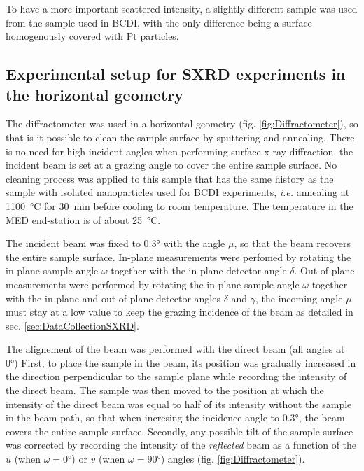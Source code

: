 To have a more important scattered intensity, a slightly different sample was used from the sample used in BCDI, with the only difference being a surface homogenously covered with Pt particles.

\subsection{Experimental setup for SXRD experiments in the horizontal geometry}\label{sec:SXRDSetupH}

The diffractometer was used in a horizontal geometry (fig. \ref{fig:Diffractometer}), so that is it possible to clean the sample surface by sputtering and annealing.
There is no need for high incident angles when performing surface x-ray diffraction, the incident beam is set at a grazing angle to cover the entire sample surface.
No cleaning process was applied to this sample that has the same history as the sample with isolated nanoparticles used for BCDI experiments, \textit{i.e.} annealing at \qty{1100}{\degreeCelsius} for \qty{30}{\minute} before cooling to room temperature.
The temperature in the MED end-station is of about \qty{25}{\degreeCelsius}.

The incident beam was fixed to \ang{0.3} with the angle $\mu$, so that the beam recovers the entire sample surface.
In-plane measurements were perfomed by rotating the in-plane sample angle $\omega$ together with the in-plane detector angle $\delta$.
Out-of-plane measurements were performed by rotating the in-plane sample angle $\omega$ together with the in-plane and out-of-plane detector angles $\delta$ and $\gamma$, the incoming angle $\mu$ must stay at a low value to keep the grazing incidence of the beam as detailed in sec. \ref{sec:DataCollectionSXRD}.

The alignement of the beam was performed with the direct beam (all angles at \ang{0})
First, to place the sample in the beam, its position was gradually increased in the direction perpendicular to the sample plane while recording the intensity of the direct beam.
The sample was then moved to the position at which the intensity of the direct beam was equal to half of its intensity without the sample in the beam path, so that when incresing the incidence angle to \ang{0.3}, the beam covers the entire sample surface.
Secondly, any possible tilt of the sample surface was corrected by recording the intensity of the \textit{reflected} beam as a function of the $u$ (when $\omega=\ang{0}$) or $v$ (when $\omega=\ang{90}$) angles (fig. \ref{fig:Diffractometer}).


